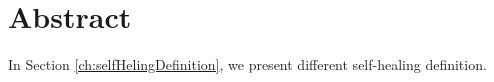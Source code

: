 \documentclass[a4paper,oneside]{scrreprt}
\begin{document}
\section*{Abstract}
In Section \ref{ch:selfHelingDefinition}, we present different self-healing definition.


\begin{versionhistory}  

 
\end{versionhistory}


\tableofcontents
\cleardoublepage













\end{document}
